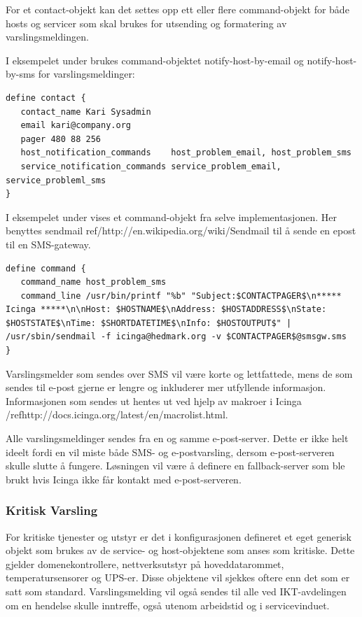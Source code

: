 For et contact-objekt kan det settes opp ett eller flere command-objekt for både hosts og servicer som skal brukes for utsending og formatering av varslingsmeldingen.  

I eksempelet under brukes command-objektet notify-host-by-email og notify-host-by-sms for varslingsmeldinger:
\begin{lstlisting}
define contact {
   contact_name Kari Sysadmin
   email kari@company.org
   pager 480 88 256 
   host_notification_commands    host_problem_email, host_problem_sms
   service_notification_commands service_problem_email, service_probleml_sms
}
\end{lstlisting}

I eksempelet under vises et command-objekt fra selve implementasjonen. Her benyttes sendmail ref/{http://en.wikipedia.org/wiki/Sendmail} til å sende en epost til en SMS-gateway.

\begin{lstlisting}
define command {
   command_name host_problem_sms
   command_line /usr/bin/printf "%b" "Subject:$CONTACTPAGER$\n***** Icinga *****\n\nHost: $HOSTNAME$\nAddress: $HOSTADDRESS$\nState: $HOSTSTATE$\nTime: $SHORTDATETIME$\nInfo: $HOSTOUTPUT$" | /usr/sbin/sendmail -f icinga@hedmark.org -v $CONTACTPAGER$@smsgw.sms
}
\end{lstlisting}

Varslingsmelder som sendes over SMS vil være korte og lettfattede, mens de som sendes til e-post gjerne er lengre og inkluderer mer utfyllende informasjon. Informasjonen som sendes ut hentes ut ved hjelp av makroer i Icinga /ref{http://docs.icinga.org/latest/en/macrolist.html}. 

Alle varslingsmeldinger sendes fra en og samme e-post-server. Dette er ikke helt ideelt fordi en vil miste både SMS- og e-postvarsling, dersom e-post-serveren skulle slutte å fungere. Løsningen vil være å definere en fallback-server som ble brukt hvis Icinga ikke får kontakt med e-post-serveren. 

\subsubsection{Kritisk Varsling}

For kritiske tjenester og utstyr er det i konfigurasjonen defineret et eget generisk objekt som brukes av de service- og host-objektene som anses som kritiske. Dette gjelder domenekontrollere, nettverksutstyr på hoveddatarommet, temperatursensorer og UPS-er. Disse objektene vil sjekkes oftere enn det som er satt som standard. Varslingsmelding vil også sendes til alle ved IKT-avdelingen om en hendelse skulle inntreffe, også utenom arbeidstid og i servicevinduet.

